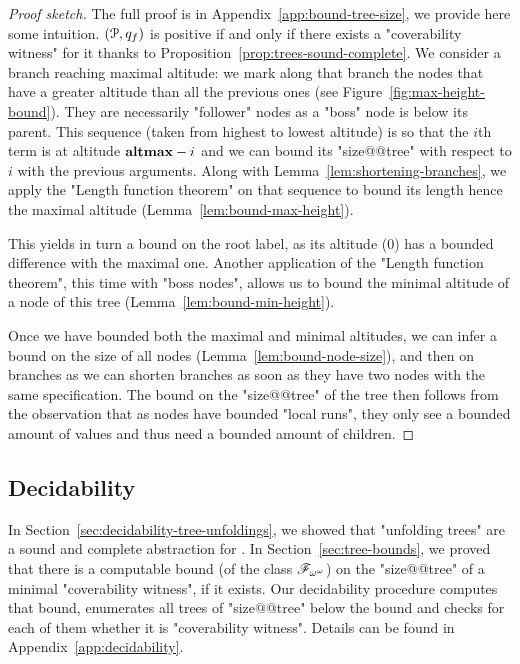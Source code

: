 \begin{proof}[Proof sketch]
	The full proof is in Appendix~\ref{app:bound-tree-size}, we provide here some intuition. $(\mathcal{P},q_f)$ is positive if and only if there exists a "coverability witness" for it thanks to Proposition~\ref{prop:trees-sound-complete}.
	We consider a branch reaching maximal altitude: we mark along that branch the nodes that have a greater altitude than all the previous ones (see Figure~\ref{fig:max-height-bound}). They are necessarily "follower" nodes as a "boss" node is below its parent. This sequence (taken from highest to lowest altitude) is so that the $i$th term is at altitude $\mathbf{altmax}-i$ and we can bound its "size@@tree" with respect to $i$ with the previous arguments. Along with Lemma~\ref{lem:shortening-branches}, we apply the "Length function theorem" on that sequence to bound its length hence the maximal altitude (Lemma~\ref{lem:bound-max-height}).
	
	This yields in turn a bound on the root label, as its altitude ($0$) has a bounded difference with the maximal one. Another application of the "Length function theorem", this time with "boss nodes", allows us to bound the minimal altitude of a node of this tree (Lemma~\ref{lem:bound-min-height}).
	
	Once we have bounded both the maximal and minimal altitudes, we can infer a bound on the size of all nodes (Lemma~\ref{lem:bound-node-size}), and then on branches as we can shorten branches as soon as they have two nodes with the same specification.
	The bound on the "size@@tree" of the tree then follows from the observation that as nodes have bounded "local runs", they only see a bounded amount of values and thus need a bounded amount of children. 
\end{proof}


\subsection{Decidability}
\label{sec:decidability-end}

In Section~\ref{sec:decidability-tree-unfoldings}, we showed that "unfolding trees" are a sound and complete abstraction for \COVER. In Section~\ref{sec:tree-bounds}, we proved that there is a computable bound (of the class $\mathscr{F}_{\omega^\omega}$) on the "size@@tree" of a minimal "coverability witness", if it exists. Our decidability procedure computes that bound, enumerates all trees of "size@@tree" below the bound and checks for each of them whether it is "coverability witness". Details can be found in Appendix~\ref{app:decidability}.

\decidablecover*


